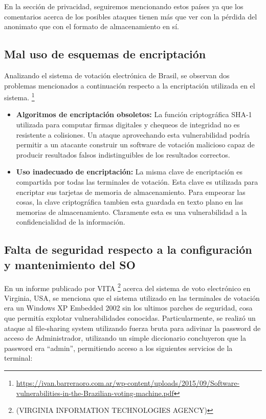 En la sección de privacidad, seguiremos mencionando estos países ya que los comentarios acerca de los posibles ataques tienen más que ver con la pérdida del anonimato que con el formato de almacenamiento en sí.

\subsection{Mal uso de esquemas de encriptación}
Analizando el sistema de votación electrónica de Brasil, se observan dos problemas mencionados a continuación respecto a la encriptación utilizada en el sistema.
\footnote{\url{https://ivan.barreraoro.com.ar/wp-content/uploads/2015/09/Software-vulnerabilities-in-the-Brazilian-voting-machine.pdf}}
\begin{itemize}
	\item \textbf{Algoritmos de encriptación obsoletos:} La función criptográfica SHA-1 utilizada para computar firmas digitales y chequeos de integridad no es resistente a colisiones. Un ataque aprovechando esta vulnerabilidad podría permitir a un atacante construir un software de votación malicioso capaz de producir resultados falsos indistinguibles de los resultados correctos.
	\item \textbf{Uso inadecuado de encriptación: } La misma clave de encriptación es compartida por todas las terminales de votación. Esta clave es utilizada para encriptar sus tarjetas de memoria de almacenamiento. Para empeorar las cosas, la clave criptográfica tambien esta guardada en texto plano en las memorias de almacenamiento. Claramente esta es una vulnerabilidad a la confidencialidad de la información.
\end{itemize}


\subsection{Falta de seguridad respecto a la configuración y mantenimiento del SO}
En un informe publicado por VITA \footnote{(VIRGINIA INFORMATION TECHNOLOGIES AGENCY)} acerca del sistema de voto electrónico en Virginia, USA, se menciona que el sistema utilizado en las terminales de votación era un Windows XP Embedded 2002 sin los ultimos parches de seguridad, cosa que permitía explotar vulnerabilidades conocidas. Particularmente, se realizó un ataque al file-sharing system utilizando fuerza bruta para adivinar la password de acceso de Administrador, utilizando un simple diccionario concluyeron que la password era ``admin'', permitiendo acceso a los siguientes servicios de la terminal:

